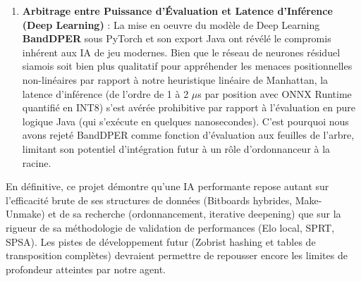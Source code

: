 \documentclass[12pt,a4paper]{article}
\begin{document}
\begin{enumerate}
    \item \textbf{Arbitrage entre Puissance d'Évaluation et Latence d'Inférence (Deep Learning)} :
    La mise en oeuvre du modèle de Deep Learning \textbf{BandDPER} sous PyTorch et son export Java ont révélé le compromis inhérent aux IA de jeu modernes. Bien que le réseau de neurones résiduel siamois soit bien plus qualitatif pour appréhender les menaces positionnelles non-linéaires par rapport à notre heuristique linéaire de Manhattan, la latence d'inférence (de l'ordre de 1 à 2 $\mu$s par position avec ONNX Runtime quantifié en INT8) s'est avérée prohibitive par rapport à l'évaluation en pure logique Java (qui s'exécute en quelques nanosecondes). C'est pourquoi nous avons rejeté BandDPER comme fonction d'évaluation aux feuilles de l'arbre, limitant son potentiel d'intégration futur à un rôle d'ordonnanceur à la racine.
\end{enumerate}

En définitive, ce projet démontre qu'une IA performante repose autant sur l'efficacité brute de ses structures de données (Bitboards hybrides, Make-Unmake) et de sa recherche (ordonnancement, iterative deepening) que sur la rigueur de sa méthodologie de validation de performances (Elo local, SPRT, SPSA). Les pistes de développement futur (Zobrist hashing et tables de transposition complètes) devraient permettre de repousser encore les limites de profondeur atteintes par notre agent.
\end{document}
